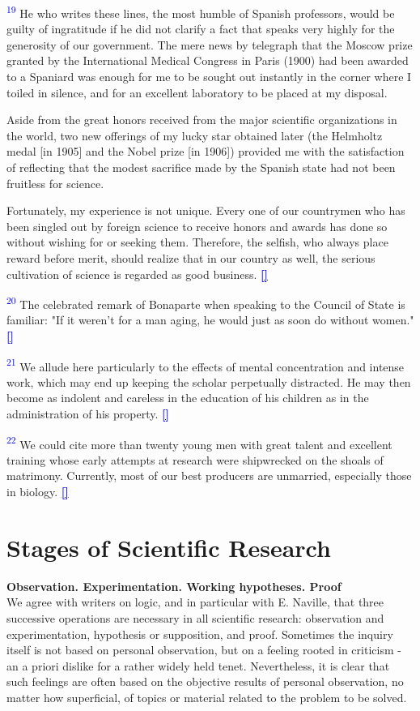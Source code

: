 \documentclass{article}
\newcommand{\boldline}[1]{%
 \vspace{\baselineskip}%
 \noindent\textbf{#1}\\[0.5\baselineskip]%
}
\newcommand{\notetext}[2]{
 \par\noindent
 \hypertarget{note:#1}{\textsuperscript{\textcolor{blue}{#1}}} #2
 \hyperlink{ref:#1}{\textcolor{blue}{\textbf{[\textuparrow]}}}
 \par\vspace{1em}
}
\begin{document}
\notetext{19}{ He who writes these lines, the most humble of Spanish professors, would be guilty of ingratitude if he did not clarify a fact that speaks very highly for the generosity of our government. The mere news by telegraph that the Moscow prize granted by the International Medical Congress in Paris (1900) had been awarded to a Spaniard was enough for me to be sought out instantly in the corner where I toiled in silence, and for an excellent laboratory to be placed at my disposal.

Aside from the great honors received from the major scientific organizations in the world, two new offerings of my lucky star obtained later (the Helmholtz medal [in 1905] and the Nobel prize [in 1906]) provided me with the satisfaction of reflecting that the modest sacrifice made by the Spanish state had not been fruitless for science.

Fortunately, my experience is not unique. Every one of our countrymen who has been singled out by foreign science to receive honors and awards has done so without wishing for or seeking them. Therefore, the selfish, who always place reward before merit, should realize that in our country as well, the serious cultivation of science is regarded as good business. }

\notetext{20}{ The celebrated remark of Bonaparte when speaking to the Council of State is familiar: "If it weren’t for a man aging, he would just as soon do without women." }

\notetext{21}{ We allude here particularly to the effects of mental concentration and intense work, which may end up keeping the scholar perpetually distracted. He may then become as indolent and careless in the education of his children as in the administration of his property. }

\notetext{22}{ We could cite more than twenty young men with great talent and excellent training whose early attempts at research were shipwrecked on the shoals of matrimony. Currently, most of our best producers are unmarried, especially those in biology. }


\newpage \section{Stages of Scientific Research}

\boldline{Observation. Experimentation. Working hypotheses. Proof}

We agree with writers on logic, and in particular with E. Naville, that three successive operations are necessary in all scientific research: observation and experimentation, hypothesis or supposition, and proof. Sometimes the inquiry itself is not based on personal observation, but on a feeling rooted in criticism - an a priori dislike for a rather widely held tenet. Nevertheless, it is clear that such feelings are often based on the objective results of personal observation, no matter how superficial, of topics or material related to the problem to be solved.
\end{document}
